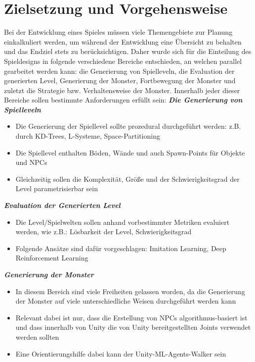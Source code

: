 \section{Zielsetzung und Vorgehensweise}
\label{Zielsetzung_und_Vorgehensweise}

Bei der Entwicklung eines Spieles müssen viele Themengebiete zur Planung einkalkuliert werden, um während der Entwicklung eine Übersicht zu behalten und das Endziel stets zu berücksichtigen. Daher wurde sich für die Einteilung des Spieldesigns in folgende verschiedene Bereiche entschieden, an welchen parallel gearbeitet werden kann: die Generierung von Spielleveln, die Evaluation der generierten Level, Generierung der Monster, Fortbewegung der Monster und zuletzt die Strategie bzw. Verhaltensweise der Monster. Innerhalb jeder dieser Bereiche sollen bestimmte Anforderungen erfüllt sein: \newline \newline
\textbf{\textit{Die Generierung von Spielleveln}}\newline
\begin{itemize}
	\item Die Generierung der Spiellevel sollte prozedural durchgeführt werden: z.B. durch KD-Trees, L-Systeme, Space-Partitioning
	\item Die Spiellevel enthalten Böden, Wände und auch Spawn-Points für Objekte und NPCs
	\item Gleichzeitig sollen die Komplexität, Größe und der Schwierigkeitsgrad der Level parametrisierbar sein
\end{itemize}
\textbf{\textit{Evaluation der Generierten Level}}
\begin{itemize}
	\item Die Level/Spielwelten sollen anhand vorbestimmter Metriken evaluiert werden, wie z.B.: Lösbarkeit der Level, Schwierigkeitsgrad
	\item Folgende Ansätze sind dafür vorgeschlagen: Imitation Learning, Deep Reinforcement Learning
\end{itemize}
\textbf{\textit{Generierung der Monster}}
\begin{itemize}
	\item In diesem Bereich sind viele Freiheiten gelassen worden, da die Generierung der Monster auf viele unterschiedliche Weisen durchgeführt werden kann
	\item Relevant dabei ist nur, dass die Erstellung von NPCs algorithmus-basiert ist und dass innerhalb von Unity die von Unity bereitgestellten Joints verwendet werden sollten
	\item Eine Orientierungshilfe dabei kann der Unity-ML-Agents-Walker sein
\end{itemize}
